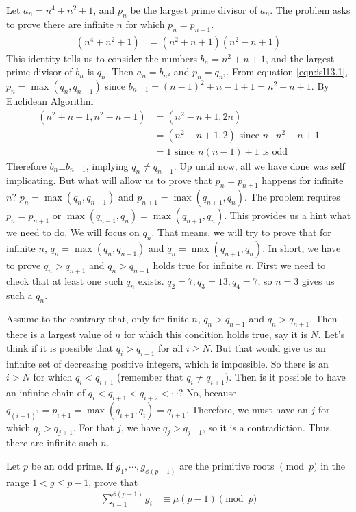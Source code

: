 \documentclass[problems.tex]{subfile}
\begin{document}
	\begin{solution}
		Let $a_n=n^4+n^2+1$, and $p_n$ be the largest prime divisor of $a_n$. The problem asks to prove there are infinite $n$ for which $p_n=p_{n+1}$.
			\begin{align}
				(n^4+n^2+1) & = (n^2+n+1)(n^2-n+1)\label{eqn:isl13.1}
			\end{align}
		This identity tells us to consider the numbers $b_n=n^2+n+1$, and the largest prime divisor of $b_n$ is $q_n$. Then $a_n=b_{n^2}$ and $p_n=q_{n^2}$. From equation \eqref{eqn:isl13.1}, $p_n=\max(q_n,q_{n-1})$ since $b_{n-1}=(n-1)^2+n-1+1=n^2-n+1$. By Euclidean Algorithm
			\begin{align*}
				(n^2+n+1,n^2-n+1) & = (n^2-n+1,2n)\\
								  & = (n^2-n+1,2)\text { since }n\bot n^2-n+1\\
								  & = 1\text { since }n(n-1)+1\text { is odd}
			\end{align*}
		Therefore $b_n\bot b_{n-1}$, implying $q_n\neq q_{n-1}$. Up until now, all we have done was self implicating. But what will allow us to prove that $p_n=p_{n+1}$ happens for infinite $n$? $p_n=\max(q_n,q_{n-1})$ and $p_{n+1}=\max(q_{n+1},q_n)$. The problem requires $p_n=p_{n+1}$ or $\max(q_{n-1},q_n)=\max(q_{n+1},q_n)$. This provides us a hint what we need to do. We will focus on $q_n$. That means, we will try to prove that for infinite $n$, $q_n=\max(q_n,q_{n-1})$ and $q_n=\max(q_{n+1},q_n)$. In short, we have to prove $q_n>q_{n+1}$ and $q_n>q_{n-1}$ holds true for infinite $n$. First we need to check that at least one such $q_n$ exists. $q_2=7,q_3=13,q_4=7$, so $n=3$ gives us such a $q_n$.
		
		Assume to the contrary that, only for finite $n$, $q_n>q_{n-1}$ and $q_n>q_{n+1}$. Then there is a largest value of $n$ for which this condition holds true, say it is $N$. Let's think if it is possible that $q_i>q_{i+1}$ for all $i\geq N$. But that would give us an infinite set of decreasing positive integers, which is impossible. So there is an $i>N$ for which $q_i<q_{i+1}$ (remember that $q_i\neq q_{i+1}$). Then is it possible to have an infinite chain of $q_i<q_{i+1}<q_{i+2}<\cdots$? No, because $q_{(i+1)^2}=p_{i+1}=\max(q_{i+1},q_i)=q_{i+1}$. Therefore, we must have an $j$ for which $q_j>q_{j+1}$. For that $j$, we have $q_j>q_{j-1}$, so it is a contradiction. Thus, there are infinite such $n$.
	\end{solution}
	
	\begin{problem}
		Let $p$ be an odd prime. If $g_{1}, \cdots, g_{\phi(p-1)}$ are the primitive roots $\pmod{p}$ in the range $1<g \le p-1$, prove that
			\begin{align*}
				\sum_{i=1}^{\phi(p-1)}g_{i}
					& \equiv \mu(p-1) \pmod{p}
			\end{align*}
	\end{problem}
	
\end{document}
